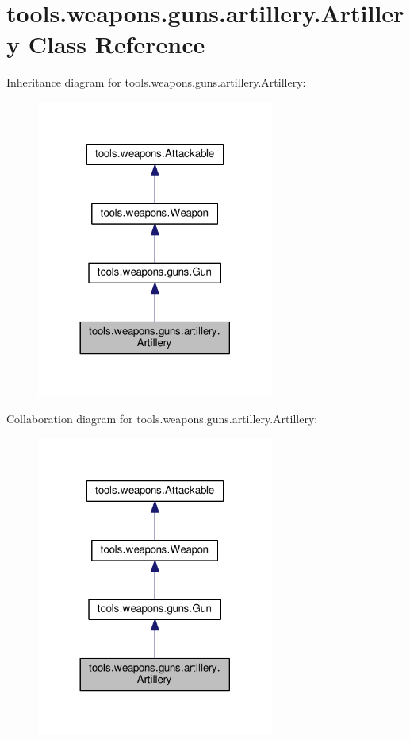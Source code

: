 \hypertarget{classtools_1_1weapons_1_1guns_1_1artillery_1_1_artillery}{}\section{tools.\+weapons.\+guns.\+artillery.\+Artillery Class Reference}
\label{classtools_1_1weapons_1_1guns_1_1artillery_1_1_artillery}


Inheritance diagram for tools.\+weapons.\+guns.\+artillery.\+Artillery\+:\nopagebreak
\begin{figure}[H]
\begin{center}
\leavevmode
\includegraphics[width=221pt]{classtools_1_1weapons_1_1guns_1_1artillery_1_1_artillery__inherit__graph}
\end{center}
\end{figure}


Collaboration diagram for tools.\+weapons.\+guns.\+artillery.\+Artillery\+:\nopagebreak
\begin{figure}[H]
\begin{center}
\leavevmode
\includegraphics[width=221pt]{classtools_1_1weapons_1_1guns_1_1artillery_1_1_artillery__coll__graph}
\end{center}
\end{figure}
